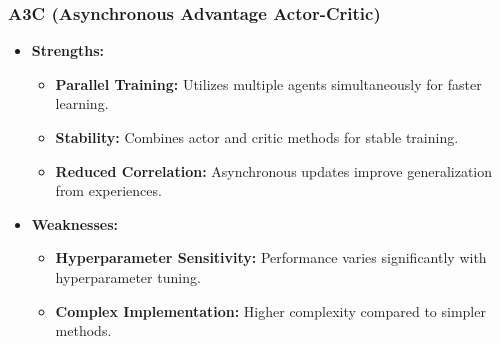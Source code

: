 \documentclass{beamer}
\begin{document}
\begin{frame}[fragile]
    \frametitle{A3C (Asynchronous Advantage Actor-Critic)}
    \begin{itemize}
        \item \textbf{Strengths:}
        \begin{itemize}
            \item \textbf{Parallel Training:} Utilizes multiple agents simultaneously for faster learning.
            \item \textbf{Stability:} Combines actor and critic methods for stable training.
            \item \textbf{Reduced Correlation:} Asynchronous updates improve generalization from experiences.
        \end{itemize}
        \item \textbf{Weaknesses:}
        \begin{itemize}
            \item \textbf{Hyperparameter Sensitivity:} Performance varies significantly with hyperparameter tuning.
            \item \textbf{Complex Implementation:} Higher complexity compared to simpler methods.
        \end{itemize}
    \end{itemize}
\end{frame}
\end{document}
